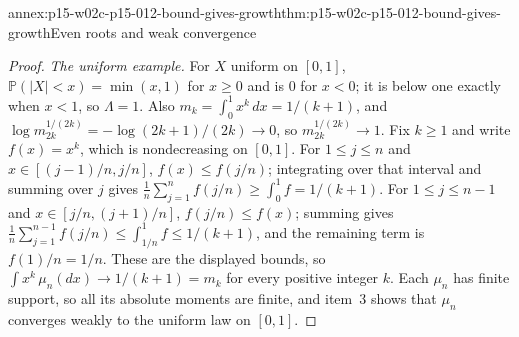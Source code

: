 \begin{annexitem}{annex:p15-w02c-p15-012-bound-gives-growth}{thm:p15-w02c-p15-012-bound-gives-growth}{Even roots and weak convergence}
\begin{proof}
\emph{The uniform example.} For \(X\) uniform on \([0,1]\),
\(\mathbb P(|X|<x)=\min(x,1)\) for \(x\geq0\) and is \(0\) for \(x<0\);
it is below one exactly when \(x<1\), so \(\Lambda=1\). Also
\(m_k=\int_0^1x^k\,dx=1/(k+1)\), and
\(\log m_{2k}^{1/(2k)}=-\log(2k+1)/(2k)\to0\), so
\(m_{2k}^{1/(2k)}\to1\). Fix \(k\geq1\) and write \(f(x)=x^k\), which is
nondecreasing on \([0,1]\). For \(1\leq j\leq n\) and
\(x\in[(j-1)/n,j/n]\), \(f(x)\leq f(j/n)\); integrating over that interval
and summing over \(j\) gives
\(\frac1n\sum_{j=1}^nf(j/n)\geq\int_0^1f=1/(k+1)\). For \(1\leq j\leq n-1\)
and \(x\in[j/n,(j+1)/n]\), \(f(j/n)\leq f(x)\); summing gives
\(\frac1n\sum_{j=1}^{n-1}f(j/n)\leq\int_{1/n}^1f\leq1/(k+1)\), and the
remaining term is \(f(1)/n=1/n\). These are the displayed bounds, so
\(\int x^k\,\mu_n(dx)\to1/(k+1)=m_k\) for every positive integer \(k\).
Each \(\mu_n\) has finite support, so all its absolute moments are
finite, and item~3 shows that \(\mu_n\) converges weakly to the uniform law on \([0,1]\).
\end{proof}
\end{annexitem}

